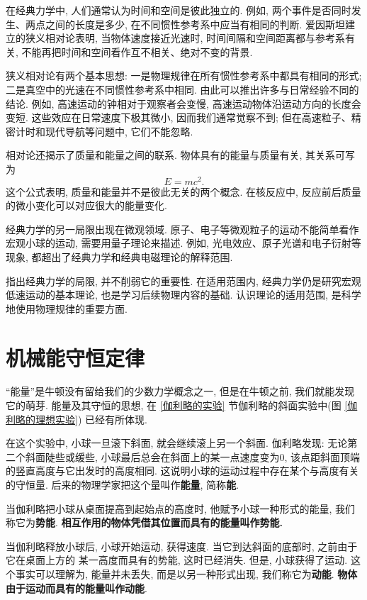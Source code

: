 \documentclass[11pt,a4paper]{ctexbook}
\begin{document}
在经典力学中, 人们通常认为时间和空间是彼此独立的. 例如, 两个事件是否同时发生、两点之间的长度是多少,
在不同惯性参考系中应当有相同的判断. 爱因斯坦建立的狭义相对论表明, 当物体速度接近光速时,
时间间隔和空间距离都与参考系有关, 不能再把时间和空间看作互不相关、绝对不变的背景.

狭义相对论有两个基本思想: 一是物理规律在所有惯性参考系中都具有相同的形式; 二是真空中的光速在不同惯性参考系中相同.
由此可以推出许多与日常经验不同的结论. 例如, 高速运动的钟相对于观察者会变慢, 高速运动物体沿运动方向的长度会变短.
这些效应在日常速度下极其微小, 因而我们通常觉察不到; 但在高速粒子、精密计时和现代导航等问题中, 它们不能忽略.

相对论还揭示了质量和能量之间的联系. 物体具有的能量与质量有关, 其关系可写为
$$E=mc^2.$$
这个公式表明, 质量和能量并不是彼此无关的两个概念. 在核反应中, 反应前后质量的微小变化可以对应很大的能量变化.

经典力学的另一局限出现在微观领域. 原子、电子等微观粒子的运动不能简单看作宏观小球的运动,
需要用量子理论来描述. 例如, 光电效应、原子光谱和电子衍射等现象, 都超出了经典力学和经典电磁理论的解释范围.

指出经典力学的局限, 并不削弱它的重要性. 在适用范围内, 经典力学仍是研究宏观低速运动的基本理论,
也是学习后续物理内容的基础. 认识理论的适用范围, 是科学地使用物理规律的重要方面.

\chapter{机械能守恒定律}

``能量''是牛顿没有留给我们的少数力学概念之一, 但是在牛顿之前, 我们就能发现它的萌芽.
能量及其守恒的思想, 在 \ref{伽利略的实验} 节伽利略的斜面实验中(图 \ref{伽利略的理想实验})
已经有所体现.

在这个实验中, 小球一旦滚下斜面, 就会继续滚上另一个斜面. 伽利略发现:
无论第二个斜面陡些或缓些, 小球最后总会在斜面上的某一点速度变为0,
该点距斜面顶端的竖直高度与它出发时的高度相同. 这说明小球的运动过程中存在某个与高度有关的守恒量.
后来的物理学家把这个量叫作\textbf{能量}, 简称\textbf{能}.

当伽利略把小球从桌面提高到起始点的高度时, 他赋予小球一种形式的能量,
我们称它为\textbf{势能}. \textbf{相互作用的物体凭借其位置而具有的能量叫作势能.}

当伽利略释放小球后, 小球开始运动, 获得速度. 当它到达斜面的底部时, 之前由于它在桌面上方的
某一高度而具有的势能, 这时已经消失. 但是, 小球获得了运动.
这个事实可以理解为, 能量并未丢失, 而是以另一种形式出现, 我们称它为\textbf{动能}.
\textbf{物体由于运动而具有的能量叫作动能}.
\end{document}
